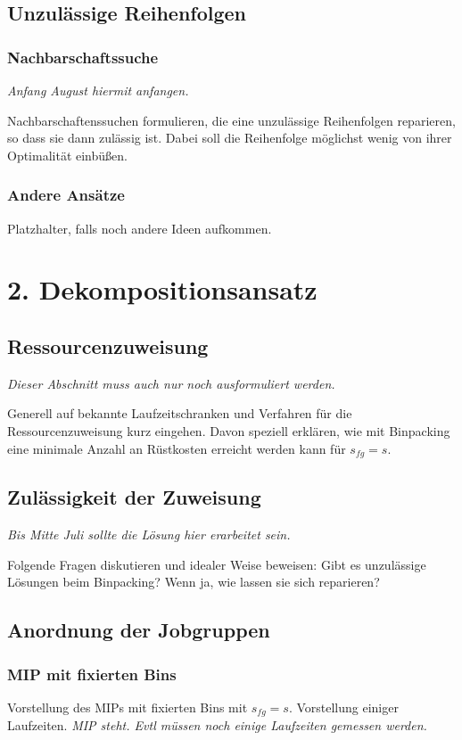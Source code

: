 \documentclass{scrreprt}
\begin{document}
\section{Unzulässige Reihenfolgen}
\subsection{Nachbarschaftssuche}
\textit{Anfang August hiermit anfangen.}

Nachbarschaftenssuchen formulieren, die eine unzulässige Reihenfolgen reparieren, so dass sie dann zulässig ist.
Dabei soll die Reihenfolge möglichst wenig von ihrer Optimalität einbüßen.

\subsection{Andere Ansätze}
Platzhalter, falls noch andere Ideen aufkommen.


\chapter{2. Dekompositionsansatz}
\section{Ressourcenzuweisung}
\textit{Dieser Abschnitt muss auch nur noch ausformuliert werden.}

Generell auf bekannte Laufzeitschranken und Verfahren für die Ressourcenzuweisung kurz eingehen.
Davon speziell erklären, wie mit Binpacking eine minimale Anzahl an Rüstkosten erreicht werden kann für $s_{fg}=s$.


\section{Zulässigkeit der Zuweisung}
\textit{Bis Mitte Juli sollte die Lösung hier erarbeitet sein.}

Folgende Fragen diskutieren und idealer Weise beweisen:
Gibt es unzulässige Lösungen beim Binpacking? Wenn ja, wie lassen sie sich reparieren?


\section{Anordnung der Jobgruppen}
\subsection{MIP mit fixierten Bins}
Vorstellung des MIPs mit fixierten Bins mit $s_{fg}=s$. Vorstellung einiger Laufzeiten. 
\textit{MIP steht. Evtl müssen noch einige Laufzeiten gemessen werden.}
\end{document}
